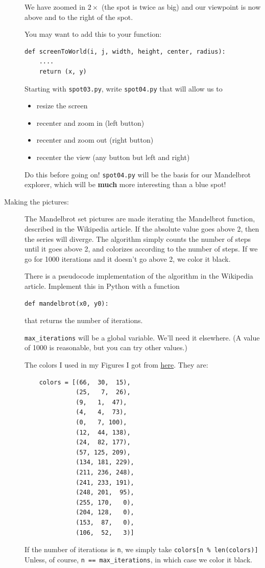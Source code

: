 \documentclass[12pt]{article}
\begin{document}
\begin{description}
We have zoomed in $2\times$ (the spot is twice as big)
and our viewpoint is now above and to the right
of the spot.

You may want to add this to your function:
\begin{lstlisting}
def screenToWorld(i, j, width, height, center, radius):
    ....
    return (x, y)
\end{lstlisting}
Starting with \lstinline{spot03.py}, write 
\lstinline{spot04.py} that will allow us to
\begin{itemize}
\item resize the screen
\item recenter and zoom in (left button)
\item recenter and zoom out (right button)
\item recenter the view (any button but left and right)
\end{itemize}

Do this before going on!  \lstinline{spot04.py}
will be the basis for our Mandelbrot explorer,
which will be {\bf much} more interesting than
a blue spot!



\item[Making the pictures:]
The Mandelbrot set
pictures are made iterating the  Mandelbrot
function, described in the Wikipedia article.  
If the absolute value goes above 2,
then the series will diverge.  The algorithm simply counts
the number of steps until it goes above 2,
and colorizes according to the number of steps.  
If we go for 1000
iterations and it doesn't go above 2, we color it
black.

There is a pseudocode implementation of the
algorithm in the Wikipedia article.  Implement
this in Python with a function
\begin{lstlisting}
def mandelbrot(x0, y0):
\end{lstlisting}
that returns the number of iterations.

\lstinline{max_iterations} will be a global
variable.  We'll need it elsewhere.  (A value of
1000 is reasonable, but you can try other values.)

The colors I used in my Figures I got from 
\href{https://stackoverflow.com/questions/16500656/which-color-gradient-is-used-to-color-mandelbrot-in-wikipedia}{here}.
They are:
\begin{lstlisting}
    colors = [(66,  30,  15),
              (25,   7,  26),
              (9,   1,  47),
              (4,   4,  73),
              (0,   7, 100),
              (12,  44, 138),
              (24,  82, 177),
              (57, 125, 209),
              (134, 181, 229),
              (211, 236, 248),
              (241, 233, 191),
              (248, 201,  95),
              (255, 170,   0),
              (204, 128,   0),
              (153,  87,   0),
              (106,  52,   3)]
\end{lstlisting}
If the number of iterations is \lstinline{n},
we simply take \lstinline{colors[n % len(colors)]}
Unless, of course, \lstinline{n == max_iterations},
in which case we color it black.


\end{description}
\end{document}
